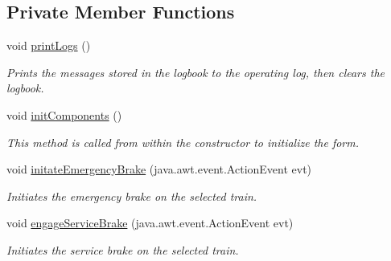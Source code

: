 \subsection*{Private Member Functions}
\begin{DoxyCompactItemize}
\item 
void \hyperlink{classTrainControllerComps_1_1TCBrakePanel_a901968694edba045f8ee6216d89a4096}{print\+Logs} ()
\begin{DoxyCompactList}\small\item\em Prints the messages stored in the logbook to the operating log, then clears the logbook. \end{DoxyCompactList}\item 
void \hyperlink{classTrainControllerComps_1_1TCBrakePanel_a9de925ba11a22e74716c6009d666b0d2}{init\+Components} ()
\begin{DoxyCompactList}\small\item\em This method is called from within the constructor to initialize the form. \end{DoxyCompactList}\item 
void \hyperlink{classTrainControllerComps_1_1TCBrakePanel_a88605d5c8969b8c38af57f077a6289ce}{initate\+Emergency\+Brake} (java.\+awt.\+event.\+Action\+Event evt)
\begin{DoxyCompactList}\small\item\em Initiates the emergency brake on the selected train. \end{DoxyCompactList}\item 
void \hyperlink{classTrainControllerComps_1_1TCBrakePanel_a14938e5fe8d51e9f556097d274fa5b92}{engage\+Service\+Brake} (java.\+awt.\+event.\+Action\+Event evt)
\begin{DoxyCompactList}\small\item\em Initiates the service brake on the selected train. \end{DoxyCompactList}\end{DoxyCompactItemize}
